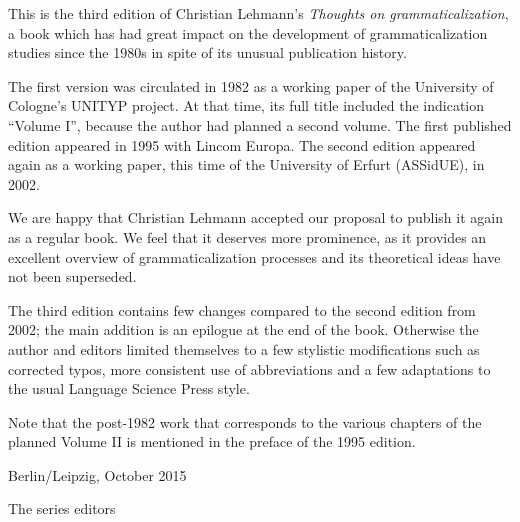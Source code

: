 
This is the third edition of Christian Lehmann’s \textit{Thoughts on grammaticalization}, a book which has had great impact on the development of grammaticalization studies since the 1980s in spite of its unusual publication history.

The first version was circulated in 1982 as a working paper of the University of Cologne’s UNITYP project. At that time, its full title included the indication ``Volume I'', because the author had planned a second volume. The first published edition appeared in 1995 with Lincom Europa. The second edition appeared again as a working paper, this time of the University of Erfurt (ASSidUE), in 2002.

We are happy that Christian Lehmann accepted our proposal to publish it again as a regular book. We feel that it deserves more prominence, as it provides an excellent overview of grammaticalization processes and its theoretical ideas have not been superseded.

The third edition contains few changes compared to the second edition from 2002; the main addition is an epilogue at the end of the book. Otherwise the author and editors limited themselves to a few stylistic modifications such as corrected typos, more consistent use of abbreviations and a few adaptations to the usual Language Science Press style.

Note that the post-1982 work that corresponds to the various chapters of the planned Volume II is mentioned in the preface of the 1995 edition.

\vspace{\baselineskip}
\begin{minipage}{.45\linewidth}
	\begin{flushleft}
		\noindent Berlin/Leipzig, October 2015  
	\end{flushleft}
\end{minipage}
\begin{minipage}{.45\linewidth}
	\begin{flushright}
		The series editors
	\end{flushright}
\end{minipage}                